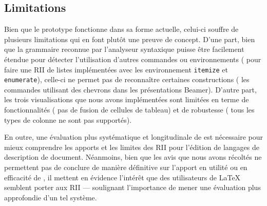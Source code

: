 \subsection{Limitations}
Bien que le prototype fonctionne dans sa forme actuelle, celui-ci souffre de plusieurs limitations qui en font plutôt une preuve de concept.
D'une part, bien que la grammaire reconnue par l'analyseur syntaxique puisse être facilement étendue pour détecter l'utilisation d'autres commandes ou environnements (\eg{} pour faire une RII de listes implémentées avec les environnement \texttt{itemize} et \texttt{enumerate}), celle-ci ne permet pas de reconnaître certaines constructions (\eg{} les commandes utilisant des chevrons dans les présentations Beamer).
D'autre part, les trois visualisations que nous avons implémentées sont limitées en terme de fonctionnalités (\eg{} pas de fusion de cellules de tableau) et de robustesse (\eg{} tous les types de colonne ne sont pas supportés).

En outre, une évaluation plus systématique et longitudinale de \iLaTeX{} est nécessaire pour mieux comprendre les apports et les limites des RII pour l'édition de langages de description de document.
Néanmoins, bien que les avis que nous avons récoltés ne permettent pas de conclure de manière définitive sur l'apport en utilité ou en efficacité de \iLaTeX{}, il mettent en évidence l'intérêt que des utilisateurs de \LaTeX{} semblent porter aux RII --- soulignant l'importance de mener une évaluation plus approfondie d'un tel système.